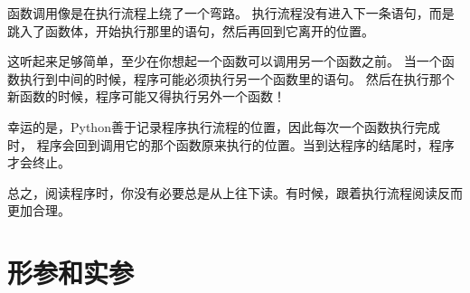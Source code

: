 
函数调用像是在执行流程上绕了一个弯路。
执行流程没有进入下一条语句，而是跳入了函数体，开始执行那里的语句，然后再回到它离开的位置。


这听起来足够简单，至少在你想起一个函数可以调用另一个函数之前。
当一个函数执行到中间的时候，程序可能必须执行另一个函数里的语句。
然后在执行那个新函数的时候，程序可能又得执行另外一个函数！


幸运的是，Python善于记录程序执行流程的位置，因此每次一个函数执行完成时，
程序会回到调用它的那个函数原来执行的位置。当到达程序的结尾时，程序才会终止。


总之，阅读程序时，你没有必要总是从上往下读。有时候，跟着执行流程阅读反而更加合理。


%
\section{形参和实参}
\label{parameters}
  
  


